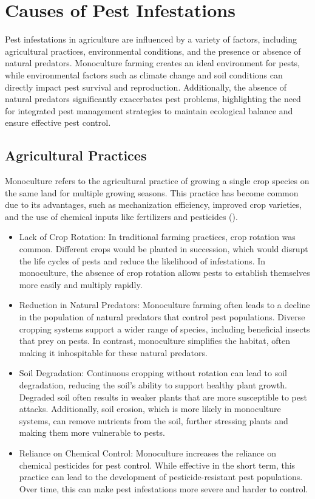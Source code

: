 \section{Causes of Pest Infestations}
Pest infestations in agriculture are influenced by a variety of factors, including agricultural practices, environmental conditions, and the presence or absence of natural predators. Monoculture farming creates an ideal environment for pests, while environmental factors such as climate change and soil conditions can directly impact pest survival and reproduction. Additionally, the absence of natural predators significantly exacerbates pest problems, highlighting the need for integrated pest management strategies to maintain ecological balance and ensure effective pest control.


\subsection{Agricultural Practices} 
Monoculture refers to the agricultural practice of growing a single crop species on the same land for multiple growing seasons. This practice has become common due to its advantages, such as mechanization efficiency, improved crop varieties, and the use of chemical inputs like fertilizers and pesticides (\cite{power_1987_monoculture}).
    \begin{itemize}
    \item Lack of Crop Rotation: In traditional farming practices, crop rotation was common. Different crops would be planted in succession, which would disrupt the life cycles of pests and reduce the likelihood of infestations. In monoculture, the absence of crop rotation allows pests to establish themselves more easily and multiply rapidly.
    \item Reduction in Natural Predators: Monoculture farming often leads to a decline in the population of natural predators that control pest populations. Diverse cropping systems support a wider range of species, including beneficial insects that prey on pests. In contrast, monoculture simplifies the habitat, often making it inhospitable for these natural predators.
    \item Soil Degradation: Continuous cropping without rotation can lead to soil degradation, reducing the soil's ability to support healthy plant growth. Degraded soil often results in weaker plants that are more susceptible to pest attacks. Additionally, soil erosion, which is more likely in monoculture systems, can remove nutrients from the soil, further stressing plants and making them more vulnerable to pests.
    \item Reliance on Chemical Control: Monoculture increases the reliance on chemical pesticides for pest control. While effective in the short term, this practice can lead to the development of pesticide-resistant pest populations. Over time, this can make pest infestations more severe and harder to control.
    \end{itemize}
